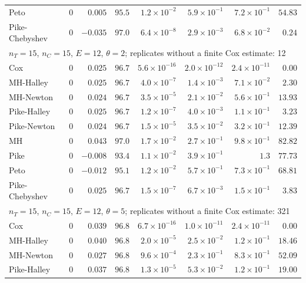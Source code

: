 \begin{landscape}
\begin{longtable}{lrrrrrrr}
Peto & 0 & $0.005$ & $95.5$ & $1.2 \times 10^{-2}$ & $5.9 \times 10^{-1}$ & $7.2 \times 10^{-1}$ & $54.83$ \\
Pike-Chebyshev & 0 & $-0.035$ & $97.0$ & $6.4 \times 10^{-8}$ & $2.9 \times 10^{-3}$ & $6.8 \times 10^{-2}$ & $0.24$ \\
\multicolumn{8}{l}{$n_T = 15$, $n_C = 15$, $E = 12$, $\theta = 2$; replicates without a finite Cox estimate: 12} \\
Cox & 0 & $0.025$ & $96.7$ & $5.6 \times 10^{-16}$ & $2.0 \times 10^{-12}$ & $2.4 \times 10^{-11}$ & $0.00$ \\
MH-Halley & 0 & $0.025$ & $96.7$ & $4.0 \times 10^{-7}$ & $1.4 \times 10^{-3}$ & $7.1 \times 10^{-2}$ & $2.30$ \\
MH-Newton & 0 & $0.024$ & $96.7$ & $3.5 \times 10^{-5}$ & $2.1 \times 10^{-2}$ & $5.6 \times 10^{-1}$ & $13.93$ \\
Pike-Halley & 0 & $0.025$ & $96.7$ & $1.2 \times 10^{-7}$ & $4.0 \times 10^{-3}$ & $1.1 \times 10^{-1}$ & $3.23$ \\
Pike-Newton & 0 & $0.024$ & $96.7$ & $1.5 \times 10^{-5}$ & $3.5 \times 10^{-2}$ & $3.2 \times 10^{-1}$ & $12.39$ \\
MH & 0 & $0.043$ & $97.0$ & $1.7 \times 10^{-2}$ & $2.7 \times 10^{-1}$ & $9.8 \times 10^{-1}$ & $82.82$ \\
Pike & 0 & $-0.008$ & $93.4$ & $1.1 \times 10^{-2}$ & $3.9 \times 10^{-1}$ & $1.3$ & $77.73$ \\
Peto & 0 & $-0.012$ & $95.1$ & $1.2 \times 10^{-2}$ & $5.7 \times 10^{-1}$ & $7.3 \times 10^{-1}$ & $68.81$ \\
Pike-Chebyshev & 0 & $0.025$ & $96.7$ & $1.5 \times 10^{-7}$ & $6.7 \times 10^{-3}$ & $1.5 \times 10^{-1}$ & $3.83$ \\
\multicolumn{8}{l}{$n_T = 15$, $n_C = 15$, $E = 12$, $\theta = 5$; replicates without a finite Cox estimate: 321} \\
Cox & 0 & $0.039$ & $96.8$ & $6.7 \times 10^{-16}$ & $1.0 \times 10^{-11}$ & $2.4 \times 10^{-11}$ & $0.00$ \\
MH-Halley & 0 & $0.040$ & $96.8$ & $2.0 \times 10^{-5}$ & $2.5 \times 10^{-2}$ & $1.2 \times 10^{-1}$ & $18.46$ \\
MH-Newton & 0 & $0.027$ & $96.8$ & $9.6 \times 10^{-4}$ & $2.3 \times 10^{-1}$ & $8.3 \times 10^{-1}$ & $52.09$ \\
Pike-Halley & 0 & $0.037$ & $96.8$ & $1.3 \times 10^{-5}$ & $5.3 \times 10^{-2}$ & $1.2 \times 10^{-1}$ & $19.00$ \\

\end{longtable}
\end{landscape}
